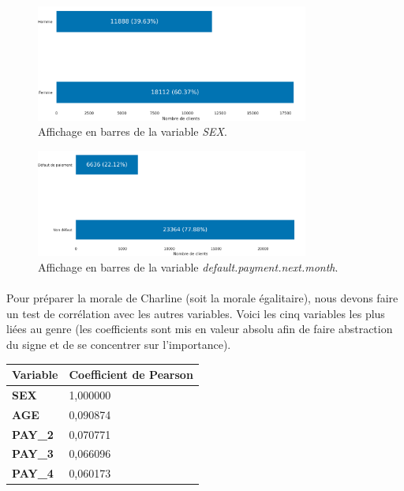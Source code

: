 \documentclass[10pt, french, a4paper]{report}
\begin{document}
\begin{figure}[hbt!]
  \centering
  \includegraphics[width=0.8\textwidth]{images/SEX.png}
  \caption{Affichage en barres de la variable \textit{SEX}.}
  \label{fig:sex}
\end{figure}
\begin{figure}[hbt!]
  \centering
  \includegraphics[width=0.8\textwidth]{images/target.png}
  \caption{Affichage en barres de la variable \textit{default.payment.next.month}.}
  \label{fig:target}
\end{figure}

\paragraph{}
Pour préparer la morale de Charline (soit la morale égalitaire), nous devons faire un test de corrélation avec les autres variables. Voici les cinq variables les plus liées au genre (les coefficients sont mis en valeur absolu afin de faire abstraction du signe et de se concentrer sur l'importance).

\begin{center}
  \begin{tabular}{ |l|l| } 
    \hline
    Variable & Coefficient de Pearson  \\
    \hline
    \hline
    \textbf{SEX} & 1,000000 \\
    \textbf{AGE} & 0,090874 \\
    \textbf{PAY\_2} & 0,070771 \\
    \textbf{PAY\_3} & 0,066096 \\
    \textbf{PAY\_4} & 0,060173 \\
    \hline
  \end{tabular}
\end{center}
\end{document}
